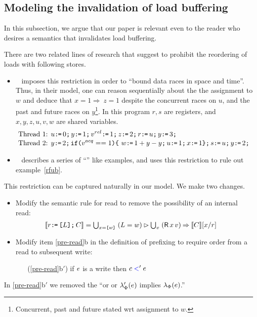 \subsection{Modeling the invalidation of load buffering} 

In this subsection, we argue that our paper is relevant even to the reader who desires a semantics that invalidates load buffering.  

There are two related lines of research that suggest to prohibit the reordering of loads with following stores.  
\begin{itemize}
\item 
~\citet{Dolan:2018:BDR:3192366.3192421} imposes this restriction in order to ``bound data races in space and time''.  Thus, in their model, one can reason sequentially about the the assignment to $w$ and deduce that $x=1 \Rightarrow\ z= 1$ despite the concurrent races on $u$, and  the past and future races on $y$\footnote{Concurrent, past and future stated wrt assignment to $w$.}.   In this program $r,s$ are registers, and $x,y,z,u,v,w$ are shared variables.
\begin{align*}
\mbox{Thread 1: } & u \texttt{:}\mkern-1mu\texttt{=}\, 0 \texttt{;}\, y \texttt{:}\mkern-1mu\texttt{=}\, 1 \texttt{;}\, v^{rel}  \texttt{:}\mkern-1mu\texttt{=}\, 1 \texttt{;}\, z \texttt{:}\mkern-1mu\texttt{=}\, 2 \texttt{;}\, r \texttt{:}\mkern-1mu\texttt{=}\, u \texttt{;}\, y \texttt{:}\mkern-1mu\texttt{=}\, 3 \texttt{;}\, \\[-.5ex]
\mbox{Thread 2: } & y \texttt{:}\mkern-1mu\texttt{=}\, 2 \texttt{;}\,  \texttt{if}\allowbreak\texttt{(}v^{acq}==1\texttt{)} \allowbreak\texttt{\{}\ w \texttt{:}\mkern-1mu\texttt{=}\, 1 + y -y \texttt{;}\, u \texttt{:}\mkern-1mu\texttt{=}\, 1 \texttt{;}\, x \texttt{:}\mkern-1mu\texttt{=}\, 1  \texttt{\}} \texttt{;}\, s \texttt{:}\mkern-1mu\texttt{=}\, u \texttt{;}\,  y \texttt{:}\mkern-1mu\texttt{=}\, 2 \texttt{;}\,
\end{align*}
\item ~\citet{BoehmOOTA} describes a series of ``\oota'' like examples, and uses this restriction to rule out example~\ref{rfub}.  
\end{itemize}

This restriction can be captured naturally in our model.  We make two changes.
\begin{itemize}
\item Modify the semantic rule for read to remove the possibility of an internal read:
  \begin{align*}
    \sem{\aReg\GETS\REF{\cExp}\SEMI \aCmd} & =
    \textstyle\bigcup_{\aLoc=\REF{\bVal}}\; ({\cExp}=\bVal) \guard \textstyle\bigcup_\aVal\; (\DR\aLoc\aVal) \prefix \sem{\aCmd}[\aLoc/\aReg] 
  \end{align*}
\item Modify item \ref{pre-read}b in the definition of prefixing to require
  order from a read to subsequent write:
  \begin{enumerate}
  \item[(\ref{pre-read}b$'$)] if $e$ is a write then  $c\mathrel{{\color{blue}<}}'e$ 
  \end{enumerate}
\end{itemize}
In \ref{pre-read}b$'$ we removed the ``or or $\lambda_{\Phi}'(e)$ implies
$\lambda_{\Phi}(e)$.''


